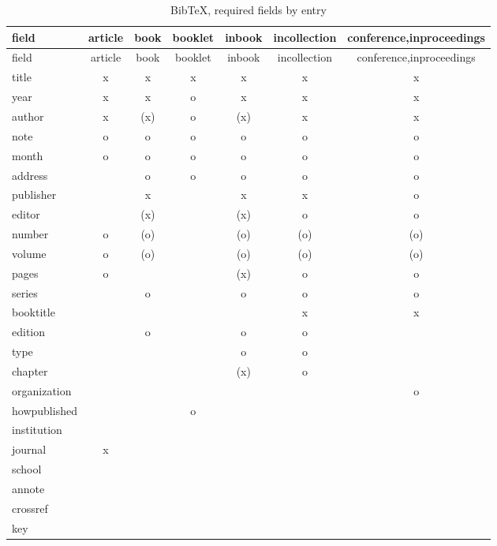 \documentclass[
]{article}
\begin{document}
\begin{longtable}[]{@{}lcccccc@{}}
\caption{BibTeX, required fields by entry}\tabularnewline
\toprule
field & article & book & booklet & inbook & incollection &
conference,inproceedings \\
\midrule
\endfirsthead
\toprule
field & article & book & booklet & inbook & incollection &
conference,inproceedings \\
\midrule
\endhead
title & x & x & x & x & x & x \\
year & x & x & o & x & x & x \\
author & x & (x) & o & (x) & x & x \\
note & o & o & o & o & o & o \\
month & o & o & o & o & o & o \\
address & & o & o & o & o & o \\
publisher & & x & & x & x & o \\
editor & & (x) & & (x) & o & o \\
number & o & (o) & & (o) & (o) & (o) \\
volume & o & (o) & & (o) & (o) & (o) \\
pages & o & & & (x) & o & o \\
series & & o & & o & o & o \\
booktitle & & & & & x & x \\
edition & & o & & o & o & \\
type & & & & o & o & \\
chapter & & & & (x) & o & \\
organization & & & & & & o \\
howpublished & & & o & & & \\
institution & & & & & & \\
journal & x & & & & & \\
school & & & & & & \\
annote & & & & & & \\
crossref & & & & & & \\
key & & & & & & \\
\bottomrule
\end{longtable}
\end{document}
